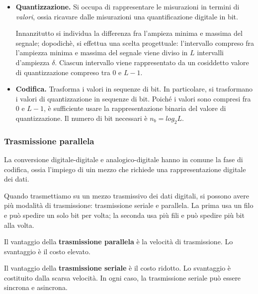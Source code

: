\begin{itemize}
                \item
                    \textbf{Quantizzazione.} Si occupa di rappresentare le misurazioni in termini di \textit{valori}, ossia ricavare dalle misurazioni una quantificazione digitale in bit.
                    
                    Innanzitutto si individua la differenza fra l'ampieza minima e massima del segnale; dopodichè, si effettua una scelta progettuale: l'intervallo compreso fra l'ampiezza minima e massima del segnale viene diviso in $L$ intervalli d'ampiezza $\delta$. Ciascun intervallo viene rappresentato da un cosiddetto valore di quantizzazione compreso tra $0$ e $L-1$.
                
                \item
                    \textbf{Codifica.} Trasforma i valori in sequenze di bit. In particolare, si trasformano i valori di quantizzazione in sequenze di bit. Poiché i valori sono compresi fra $0$ e $L-1$, è sufficiente usare la rappresentazione binaria del valore di quantizzazione. Il numero di bit necessari è $n_b = log_2 L$.
            \end{itemize}
            
        \subsubsection{Trasmissione parallela}
                
            La conversione digitale-digitale e analogico-digitale hanno in comune la fase di codifica, ossia l'impiego di uin mezzo che richiede una rappresentazione digitale dei dati.
            
            Quando trasmettiamo su un mezzo trasmissivo dei dati digitali, si possono avere più modalità di trasmissione: trasmissione seriale e parallela. La prima usa un filo e può spedire un solo bit per volta; la seconda usa più fili e può spedire più bit alla volta.
            
            Il vantaggio della \textbf{trasmissione parallela} è la velocità di trasmissione. Lo svantaggio è il costo elevato.
            
            \vspace{3mm}
            
            Il vantaggio della \textbf{trasmissione seriale} è il costo ridotto. Lo svantaggio è costituito dalla scarsa velocità. In ogni caso, la trasmissione seriale può essere sincrona e asincrona. 
            
